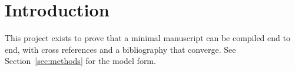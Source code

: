 \section{Introduction}\label{sec:intro}
This project exists to prove that a minimal manuscript can be compiled
end to end, with cross references and a bibliography that converge.
See Section~\ref{sec:methods} for the model form.
